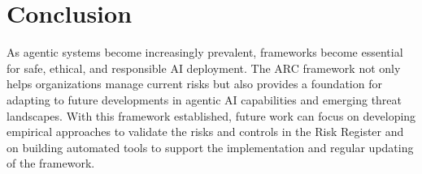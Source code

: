 \documentclass{article}
\begin{document}
\section{Conclusion}

As agentic systems become increasingly prevalent, frameworks become essential for safe, ethical, and responsible AI deployment. The ARC framework not only helps organizations manage current risks but also provides a foundation for adapting to future developments in agentic AI capabilities and emerging threat landscapes. With this framework established, future work can focus on developing empirical approaches to validate the risks and controls in the Risk Register and on building automated tools to support the implementation and regular updating of the framework.





\end{document}
